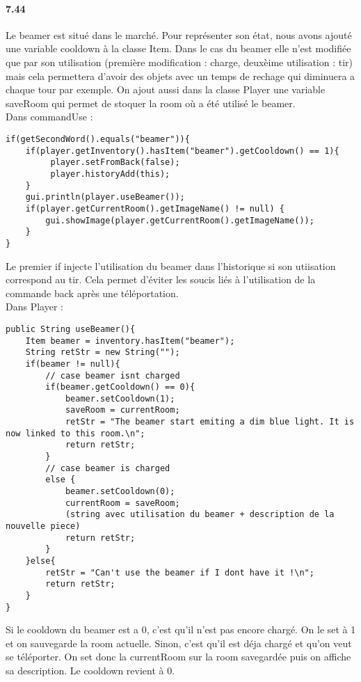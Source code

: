 \documentclass[11pt,a4paper]{report}
\begin{document}
\paragraph{7.44}
Le beamer est situé dans le marché. Pour représenter son état, nous avons ajouté une variable cooldown à la classe Item. Dans le cas du beamer elle n'est modifiée que par son utilisation (première modification : charge, deuxèime utilisation : tir) mais cela permettera d'avoir des objets avec un temps de rechage qui diminuera a chaque tour par exemple. On ajout aussi dans la classe Player une variable saveRoom qui permet de stoquer la room où a été utilisé le beamer.\\
Dans commandUse :
\begin{lstlisting}
if(getSecondWord().equals("beamer")){
    if(player.getInventory().hasItem("beamer").getCooldown() == 1){
         player.setFromBack(false);
         player.historyAdd(this);
    }
    gui.println(player.useBeamer());
    if(player.getCurrentRoom().getImageName() != null) {
        gui.showImage(player.getCurrentRoom().getImageName());
    }
}
\end{lstlisting}
Le premier if injecte l'utilisation du beamer dans l'historique si son utiisation correspond au tir. Cela permet d'éviter les soucis liés à l'utilisation de la commande back après une téléportation. \\
Dans Player :
\begin{lstlisting}
public String useBeamer(){
    Item beamer = inventory.hasItem("beamer");
    String retStr = new String("");
    if(beamer != null){
        // case beamer isnt charged
        if(beamer.getCooldown() == 0){
            beamer.setCooldown(1);
            saveRoom = currentRoom;
            retStr = "The beamer start emiting a dim blue light. It is now linked to this room.\n";
            return retStr;
        }
        // case beamer is charged
        else {
            beamer.setCooldown(0);
            currentRoom = saveRoom;
            (string avec utilisation du beamer + description de la nouvelle piece)
            return retStr;
        }
    }else{
        retStr = "Can't use the beamer if I dont have it !\n";
        return retStr;
    }
}
\end{lstlisting}
Si le cooldown du beamer est a 0, c'est qu'il n'est pas encore chargé. On le set à 1 et on sauvegarde la room actuelle. Sinon, c'est qu'il est déja chargé et qu'on veut se téléporter. On set donc la currentRoom sur la room savegardée puis on affiche sa description. Le cooldown revient à 0.
\end{document}
